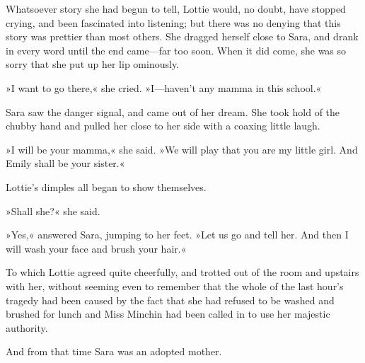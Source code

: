 Whatsoever story she had begun to tell, Lottie would, no doubt, have stopped crying, and been fascinated into listening; but there was no denying that this story was prettier than most others. She dragged herself close to Sara, and drank in every word until the end came—far too soon. When it did come, she was so sorry that she put up her lip ominously.

»I want to go there,« she cried. »I—haven't any mamma in this school.«

Sara saw the danger signal, and came out of her dream. She took hold of the chubby hand and pulled her close to her side with a coaxing little laugh.

»I will be your mamma,« she said. »We will play that you are my little girl. And Emily shall be your sister.«

Lottie's dimples all began to show themselves.

»Shall she?« she said.

»Yes,« answered Sara, jumping to her feet. »Let us go and tell her. And then I will wash your face and brush your hair.«

To which Lottie agreed quite cheerfully, and trotted out of the room and upstairs with her, without seeming even to remember that the whole of the last hour's tragedy had been caused by the fact that she had refused to be washed and brushed for lunch and Miss Minchin had been called in to use her majestic authority.

And from that time Sara was an adopted mother.

\begin{a4}
	\enlargethispage{\baselineskip}
\end{a4}